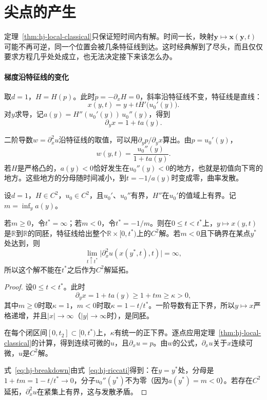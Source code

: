 \section{尖点的产生}
\label{sec:hj-cusps}

定理~\ref{thm:hj-local-classical}只保证短时间内有解。时间一长，映射$\bm{y}\mapsto\bm{x}(\bm{y},t)$可能不再可逆，同一个位置会被几条特征线到达。这时经典解到了尽头，而且仅仅要求方程几乎处处成立，也无法决定接下来该怎么办。

\paragraph{梯度沿特征线的变化}
取$d=1$，$H=H(p)$。此时$\dot{p}=-\partial_xH=0$，斜率沿特征线不变，特征线是直线：
\[
  x(y,t)=y+tH'\bigl(u_0'(y)\bigr).
\]
对$y$求导，记$a(y)=H''(u_0'(y))\,u_0''(y)$，得到
\[
  \partial_yx=1+ta(y).
\]

二阶导数$w=\partial_x^2u$沿特征线的取值，可以用$\partial_yp/\partial_yx$算出。由$p=u_0'(y)$，
\begin{equation}
  w(y,t)=\frac{u_0''(y)}{1+ta(y)}.
  \label{eq:hj-riccati}
\end{equation}
若$H$是严格凸的，$a(y)<0$恰好发生在$u_0''(y)<0$的地方，也就是初值向下弯的地方。这些地方的分母随时间减小，到$t=-1/a(y)$时变成零，曲率发散。

\begin{theorem}[经典解的首次失效]
\label{thm:hj-breakdown}
设$d=1$，$H\in C^2$，$u_0\in C^2$，且$u_0'$、$u_0''$有界，$H''$在$u_0'$的值域上有界。记$m=\inf_ya(y)$。

若$m\geq0$，令$t^*=\infty$；若$m<0$，令$t^*=-1/m$。则在$0\leq t<t^*$上，$y\mapsto x(y,t)$是$\mathbb{R}$到$\mathbb{R}$的同胚，特征线给出整个$\mathbb{R}\times[0,t^*)$上的$C^2$解。若$m<0$且下确界在某点$y^*$处达到，则
\begin{equation}
  \lim_{t\uparrow t^*}\bigl\lvert\partial_x^2u(x(y^*,t),t)\bigr\rvert=\infty,
  \label{eq:hj-breakdown}
\end{equation}
所以这个解不能在$t^*$之后作为$C^2$解延拓。
\end{theorem}

\begin{proof}
设$0\leq t<t^*$。此时
\[
  \partial_yx=1+ta(y)\geq1+tm\geq\kappa>0,
\]
其中$m\geq0$时取$\kappa=1$，$m<0$时取$\kappa=1-t/t^*$。一阶导数有正下界，所以$y\mapsto x$严格递增，并且$\lvert x\rvert\to\infty$（$\lvert y\rvert\to\infty$时），是同胚。

在每个闭区间$[0,t_2]\subset[0,t^*)$上，$\kappa$有统一的正下界。逐点应用定理~\ref{thm:hj-local-classical}的计算，得到连续可微的$u$，且$\partial_xu=p$。由$w$的公式，$\partial_xu$关于$x$连续可微，$u$是$C^2$解。

式~\eqref{eq:hj-breakdown}由式~\eqref{eq:hj-riccati}得到：在$y=y^*$处，分母是$1+tm=1-t/t^*\to0$，分子$u_0''(y^*)$不为零（因为$a(y^*)=m<0$）。若存在$C^2$延拓，$\partial_x^2u$在紧集上有界，这与发散矛盾。
\end{proof}

